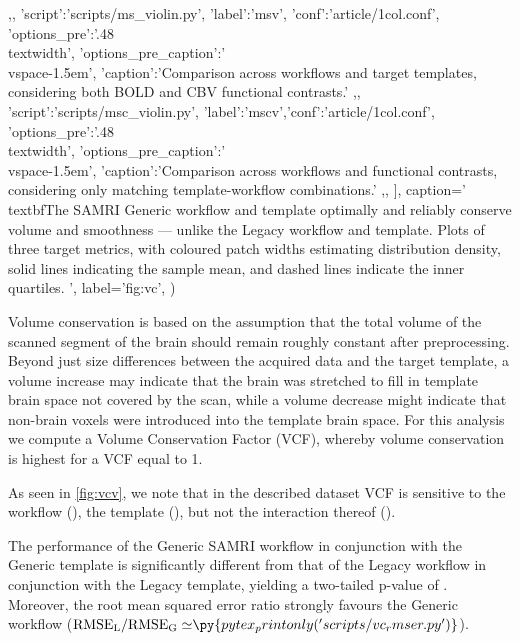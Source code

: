 \begin{sansmath}
{{                        ,},
                {'script':'scripts/ms_violin.py', 'label':'msv', 'conf':'article/1col.conf', 'options_pre':'{.48\\textwidth}',
                        'options_pre_caption':'\\vspace{-1.5em}',
			'caption':'Comparison across workflows and target templates, considering both BOLD and CBV functional contrasts.'
                        ,},
                {'script':'scripts/msc_violin.py', 'label':'mscv','conf':'article/1col.conf', 'options_pre':'{.48\\textwidth}',
                        'options_pre_caption':'\\vspace{-1.5em}',
                        'caption':'Comparison across workflows and functional contrasts, considering only matching template-workflow combinations.'
                        ,},
                ],
        caption='\\textbf{The SAMRI Generic workflow and template optimally and reliably conserve volume and smoothness --- unlike the Legacy workflow and template.}
        Plots of three target metrics, with coloured patch widths estimating distribution density, solid lines indicating the sample mean, and dashed lines indicate the inner quartiles.
        ',
        label='fig:vc',
        )}
\end{sansmath}

Volume conservation is based on the assumption that the total volume of the scanned segment of the brain should remain roughly constant after preprocessing.
Beyond just size differences between the acquired data and the target template, a volume increase may indicate that the brain was stretched to fill in template brain space not covered by the scan, while a volume decrease might indicate that non-brain voxels were introduced into the template brain space.
For this analysis we compute a Volume Conservation Factor (VCF), whereby volume conservation is highest for a VCF equal to 1.

As seen in \cref{fig:vcv}, we note that in the described dataset VCF is sensitive to
the workflow (),
the template (),
but not the interaction thereof ().

The performance of the Generic SAMRI workflow in conjunction with the Generic template is significantly different from that of the Legacy workflow in conjunction with the Legacy template, yielding a two-tailed p-value of .
Moreover, the root mean squared error ratio strongly favours the Generic workflow
($\mathrm{RMSE_{L}/RMSE_{G}\simeq} \py{pytex_printonly('scripts/vc_rmser.py')}$).


